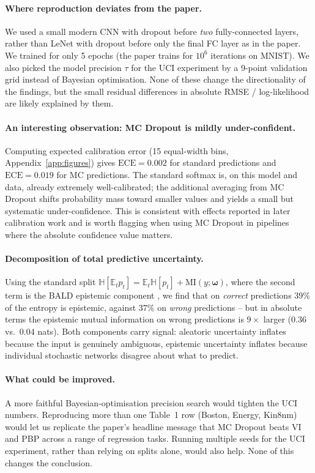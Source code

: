 \documentclass{article}
\begin{document}
\paragraph{Where reproduction deviates from the paper.} We used a small modern CNN with dropout before \emph{two} fully-connected layers, rather than LeNet with dropout before only the final FC layer as in the paper. We trained for only 5 epochs (the paper trains for $10^6$ iterations on MNIST). We also picked the model precision $\tau$ for the UCI experiment by a 9-point validation grid instead of Bayesian optimisation. None of these change the directionality of the findings, but the small residual differences in absolute RMSE / log-likelihood are likely explained by them.

\paragraph{An interesting observation: MC Dropout is mildly under-confident.} Computing expected calibration error (15 equal-width bins, Appendix~\ref{app:figures}) gives $\mathrm{ECE}=0.002$ for standard predictions and $\mathrm{ECE}=0.019$ for MC predictions. The standard softmax is, on this model and data, already extremely well-calibrated; the additional averaging from MC Dropout shifts probability mass toward smaller values and yields a small but systematic under-confidence. This is consistent with effects reported in later calibration work and is worth flagging when using MC Dropout in pipelines where the absolute confidence value matters.

\paragraph{Decomposition of total predictive uncertainty.} Using the standard split $\mathbb{H}[\mathbb{E}_t p_t] = \mathbb{E}_t \mathbb{H}[p_t] + \mathrm{MI}(y;\boldsymbol\omega)$, where the second term is the BALD epistemic component \citep{houlsby2011bayesian}, we find that on \emph{correct} predictions $39\%$ of the entropy is epistemic, against $37\%$ on \emph{wrong} predictions -- but in absolute terms the epistemic mutual information on wrong predictions is $9\times$ larger ($0.36$ vs.\ $0.04$ nats). Both components carry signal: aleatoric uncertainty inflates because the input is genuinely ambiguous, epistemic uncertainty inflates because individual stochastic networks disagree about what to predict.

\paragraph{What could be improved.} A more faithful Bayesian-optimisation precision search would tighten the UCI numbers. Reproducing more than one Table~1 row (Boston, Energy, Kin8nm) would let us replicate the paper's headline message that MC Dropout beats VI and PBP across a range of regression tasks. Running multiple seeds for the UCI experiment, rather than relying on splits alone, would also help. None of this changes the conclusion.
\end{document}
